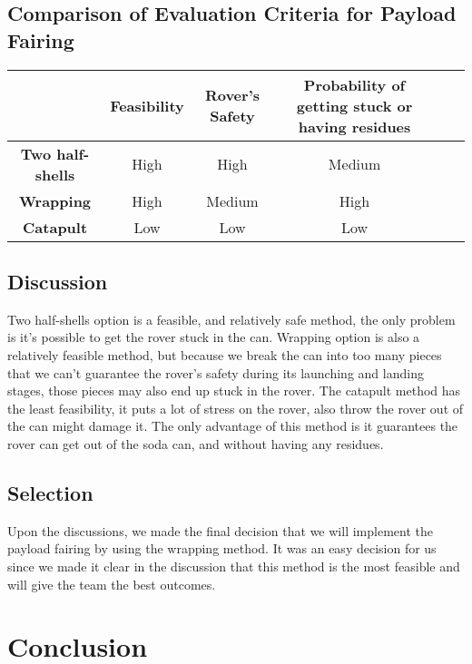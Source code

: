 \documentclass[10pt,letterpaper,onecolumn,journal]{IEEEtran}
\begin{document}
\subsection*{Comparison of Evaluation Criteria for Payload Fairing}
\begin{center}
  \begin{tabular}{cccccc}
    \hline
    \multicolumn{1}{l}{} & \textbf{Feasibility} & \textbf{Rover's Safety} & \textbf{Probability of getting stuck or having residues} \\
		\hline
		\textbf{Two half-shells}       & High & High       & Medium  \\
		\hline
		\textbf{Wrapping}		      & High  &  Medium   & High \\
		\hline
		\textbf{Catapult}			  & Low  & Low  & Low  \\
	\end{tabular}
\end{center}
\vspace{.3cm}

\subsection{Discussion}
Two half-shells option is a feasible, and relatively safe method, the only problem is it's possible to get the rover stuck in the can. Wrapping option is also a relatively feasible method, but because we break the can into too many pieces that we can't guarantee the rover's safety during its launching and landing stages, those pieces may also end up stuck in the rover. The catapult method has the least feasibility, it puts a lot of stress on the rover, also throw the rover out of the can might damage it. The only advantage of this method is it guarantees the rover can get out of the soda can, and without having any residues.  

\subsection{Selection}
Upon the discussions, we made the final decision that we will implement the payload fairing by using the wrapping method. It was an easy decision for us since we made it clear in the discussion that this method is the most feasible and will give the team the best outcomes. 

\section{Conclusion}
\end{document}
